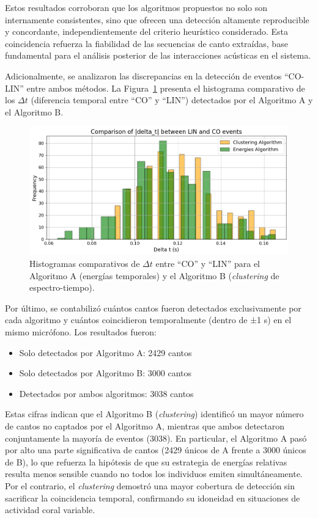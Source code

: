 Estos resultados corroboran que los algoritmos propuestos no 
solo son internamente consistentes, sino que ofrecen una 
detección altamente reproducible y concordante, 
independientemente del criterio heurístico considerado. 
Esta coincidencia refuerza la fiabilidad de las secuencias de 
canto extraídas, base fundamental para el análisis posterior de 
las interacciones acústicas en el sistema.




Adicionalmente, se analizaron las discrepancias en la detección 
de eventos “CO-LIN” entre ambos métodos. La 
Figura~\ref{fig:delta_hist} presenta el histograma comparativo 
de los \(\Delta t\) (diferencia temporal entre “CO” y “LIN”) 
detectados por el Algoritmo A y el Algoritmo B. 

\begin{figure}[ht]
    \centering
    \includegraphics[width=\columnwidth]{Graphics/histogram_energies_clustering.png}
    \caption{Histogramas comparativos de \(\Delta t\) entre “CO” y “LIN” para el Algoritmo A (energías temporales) y el Algoritmo B (\textit{clustering} de espectro-tiempo).}
    \label{fig:delta_hist}
\end{figure}

Por último, se contabilizó cuántos cantos fueron detectados 
exclusivamente por cada algoritmo y cuántos coincidieron 
temporalmente (dentro de ±1 s) en el mismo micrófono. Los 
resultados fueron:
\begin{itemize}
  \item Solo detectados por Algoritmo A: 2429 cantos
  \item Solo detectados por Algoritmo B: 3000 cantos
  \item Detectados por ambos algoritmos: 3038 cantos
\end{itemize}

Estas cifras indican que el Algoritmo B (\textit{clustering}) 
identificó un mayor número de cantos no captados por el 
Algoritmo A, mientras que ambos detectaron conjuntamente la 
mayoría de eventos (3038). En particular, el Algoritmo A pasó 
por alto una parte significativa de cantos (2429 únicos de A 
frente a 3000 únicos de B), lo que refuerza la hipótesis de 
que su estrategia de 
energías relativas resulta menos sensible cuando no todos los 
individuos emiten simultáneamente. Por el contrario, el 
\textit{clustering} demostró una mayor cobertura de detección 
sin sacrificar la coincidencia temporal, confirmando su idoneidad 
en situaciones de actividad coral variable.

